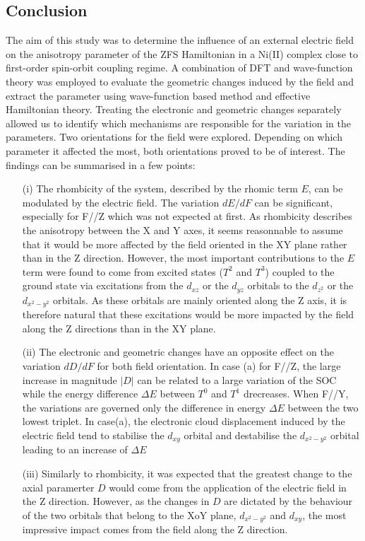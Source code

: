 \documentclass[12pt]{report}
\numberwithin{equation}{section}
\begin{document}
\newpage
\subsection{Conclusion}

The aim of this study was to determine the influence of an external electric field on the anisotropy parameter of the ZFS Hamiltonian in a Ni(II) complex close to first-order spin-orbit coupling regime. 
A combination of DFT and wave-function theory was employed to evaluate the geometric changes induced by the field and extract the parameter using wave-function based method and effective Hamiltonian theory.
Treating the electronic and geometric changes separately allowed us to identify which mechanisms are responsible for the variation in the parameters.
Two orientations for the field were explored. Depending on which parameter it affected the most, both orientations proved to be of interest.
The findings can be summarised in a few points:

\begin{itemize}
    \item[(i)] The rhombicity of the system, described by the rhomic term $E$, can be modulated by the electric field. 
    The variation $dE/dF$ can be significant, especially for F//Z which was not expected at first.
    As rhombicity describes the anisotropy between the X and Y axes, it seems reasonnable to assume that it would be more affected by the field oriented in the XY plane rather than in the Z direction.
    However, the most important contributions to the $E$ term were found to come from excited states ($T^2$ and $T^3$) coupled to the ground state via excitations from the $d_{xz}$ or the $d_{yz}$ orbitals to the $d_{z^2}$ or the $d_{x^2-y^2}$ orbitals.
    As these orbitals are mainly oriented along the Z axis, it is therefore natural that these excitations would be more impacted by the field along the Z directions than in the XY plane.
    \item[(ii)] The electronic and geometric changes have an opposite effect on the variation $dD/dF$ for both field orientation. 
    In case (a) for F//Z, the large increase in magnitude $|D|$ can be related to a large variation of the SOC while the energy difference $\Delta E$ between $T^0$ and $T^1$ drecreases.
    When F//Y, the variations are governed only the difference in energy $\Delta E$ between the two lowest triplet. 
    In case(a), the electronic cloud displacement induced by the electric field tend to stabilise the $d_{xy}$ orbital and destabilise the $d_{x^2-y^2}$ orbital leading to an increase of $\Delta E$
    \item[(iii)] Similarly to rhombicity, it was expected that the greatest change to the axial paramerter $D$ would come from the application of the electric field in the Z direction.
    However, as the changes in $D$ are dictated by the behaviour of the two orbitals that belong to the XoY plane, $d_{x^2-y^2}$ and $d_{xy}$, the most impressive impact comes from the field along the Z direction.
\end{itemize}
\end{document}
